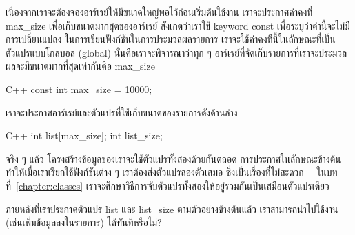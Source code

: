 เนื่องจาก{\wbr}เรา{\wbr}จะ{\wbr}ต้อง{\wbr}จอง{\wbr}อาร์เรย์{\wbr}ให้{\wbr}มี{\wbr}ขนาด{\wbr}ใหญ่{\wbr}พอ{\wbr}ไว้{\wbr}ก่อน{\wbr}เริ่มต้น{\wbr}ใช้{\wbr}งาน เรา{\wbr}จะ{\wbr}ประกาศ{\wbr}ค่าคงที่{\wbr}
{\ct max\_size} เพื่อ{\wbr}เก็บ{\wbr}ขนาด{\wbr}มาก{\wbr}สุด{\wbr}ของ{\wbr}อาร์เรย์ สังเกต{\wbr}ว่า{\wbr}เรา{\wbr}ใช้ keyword {\ct
  const} เพื่อ{\wbr}ระบุ{\wbr}ว่า{\wbr}ค่า{\wbr}นี้{\wbr}จะ{\wbr}ไม่{\wbr}มี{\wbr}การ{\wbr}เปลี่ยนแปลง{\wbr}
ใน{\wbr}การ{\wbr}เขียน{\wbr}ฟังก์ชัน{\wbr}ใน{\wbr}การ{\wbr}ประมวลผล{\wbr}รายการ{\wbr}
เรา{\wbr}จะ{\wbr}ใช้{\wbr}ค่า{\wbr}คง{\wbr}ทีนี้{\wbr}ใน{\wbr}ลักษณะ{\wbr}ที่{\wbr}เป็น{\wbr}ตัวแปร{\wbr}แบบ{\wbr}โก{\wbr}ลบ{\wbr}อล (global) นั่น{\wbr}คือ{\wbr}เรา{\wbr}จะ{\wbr}พิจารณา{\wbr}ว่า{\wbr}ทุก ๆ
อาร์เรย์ที่{\wbr}จัด{\wbr}เก็บ{\wbr}รายการ{\wbr}ที่{\wbr}เรา{\wbr}จะ{\wbr}ประมวลผล{\wbr}จะ{\wbr}มี{\wbr}ขนาด{\wbr}มาก{\wbr}ที่สุด{\wbr}เท่า{\wbr}กัน{\wbr}คือ {\ct max\_size}

\latintext
\begin{codelist}{C++}{}
const int max_size = 10000;
\end{codelist}
\thaitext

เรา{\wbr}จะ{\wbr}ประกาศ{\wbr}อาร์เรย์{\wbr}และ{\wbr}ตัวแปร{\wbr}ที่{\wbr}ใช้{\wbr}เก็บ{\wbr}ขนาด{\wbr}ของ{\wbr}รายการ{\wbr}ดัง{\wbr}ด้าน{\wbr}ล่าง 

\latintext
\begin{codelist}{C++}{}
int list[max_size];
int list_size;
\end{codelist}
\thaitext

จริง ๆ แล้ว โครงสร้าง{\wbr}ข้อมูล{\wbr}ของ{\wbr}เรา{\wbr}จะ{\wbr}ใช้{\wbr}ตัวแปร{\wbr}ทั้ง{\wbr}สอง{\wbr}ด้วย{\wbr}กัน{\wbr}ตลอด{\wbr}
การ{\wbr}ประกาศ{\wbr}ใน{\wbr}ลักษณะ{\wbr}ข้างต้น{\wbr}ทำ{\wbr}ให้{\wbr}เมื่อ{\wbr}เรา{\wbr}เรียก{\wbr}ใช้{\wbr}ฟังก์ชัน{\wbr}ต่าง ๆ เรา{\wbr}ต้อง{\wbr}ส่ง{\wbr}ตัวแปร{\wbr}สอง{\wbr}ตัว{\wbr}เสมอ{\wbr}
ซึ่ง{\wbr}เป็น{\wbr}เรื่อง{\wbr}ที่{\wbr}ไม่{\wbr}สะดวก \ \  ใน{\wbr}บท{\wbr}ที่~\ref{chapter:classes}
เรา{\wbr}จะ{\wbr}ศึกษา{\wbr}วิธีการ{\wbr}จับตัว{\wbr}แปร{\wbr}ทั้ง{\wbr}สอง{\wbr}ให้{\wbr}อยู่{\wbr}รวม{\wbr}กัน{\wbr}เป็น{\wbr}เสมือน{\wbr}ตัวแปร{\wbr}เดียว{\wbr}

\begin{quiz}{}
ภายหลัง{\wbr}ที่{\wbr}เรา{\wbr}ประกาศ{\wbr}ตัวแปร {\ct list} และ {\ct list\_size}
ตาม{\wbr}ตัวอย่าง{\wbr}ข้างต้น{\wbr}แล้ว เรา{\wbr}สามารถ{\wbr}นำ{\wbr}ไป{\wbr}ใช้{\wbr}งาน (เช่น{\wbr}เพิ่ม{\wbr}ข้อมูล{\wbr}ลง{\wbr}ใน{\wbr}รายการ)
ได้{\wbr}ทันที{\wbr}หรือ{\wbr}ไม่?
\end{quiz}

